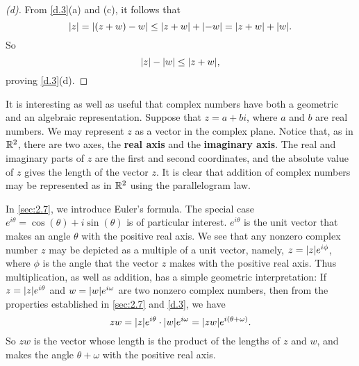 \begin{proof}[(d)]
  From \cref{d.3}(a) and (c), it follows that
  \[
    \abs{z} = \abs{(z + w) - w} \leq \abs{z + w} + \abs{-w} = \abs{z + w} + \abs{w}.
  \]
  So
  \[
    \abs{z} - \abs{w} \leq \abs{z + w},
  \]
  proving \cref{d.3}(d).
\end{proof}

\begin{defn}\label{d.0.6}
  It is interesting as well as useful that complex numbers have both a geometric and an algebraic representation.
  Suppose that \(z = a + bi\), where \(a\) and \(b\) are real numbers.
  We may represent \(z\) as a vector in the complex plane.
  Notice that, as in \(\mathbb{R}^2\), there are two axes, the \textbf{real axis} and the \textbf{imaginary axis}.
  The real and imaginary parts of \(z\) are the first and second coordinates, and the absolute value of \(z\) gives the length of the vector \(z\).
  It is clear that addition of complex numbers may be represented as in \(\mathbb{R}^2\) using the parallelogram law.

  In \cref{sec:2.7}, we introduce Euler's formula.
  The special case \(e^{i \theta} = \cos(\theta) + i \sin(\theta)\) is of particular interest.
  \(e^{i \theta}\) is the unit vector that makes an angle \(\theta\) with the positive real axis.
  We see that any nonzero complex number \(z\) may be depicted as a multiple of a unit vector, namely, \(z = \abs{z} e^{i \phi}\), where \(\phi\) is the angle that the vector \(z\) makes with the positive real axis.
  Thus multiplication, as well as addition, has a simple geometric interpretation:
  If \(z = \abs{z} e^{i \theta}\) and \(w = \abs{w} e^{i \omega}\) are two nonzero complex numbers, then from the properties established in \cref{sec:2.7} and \cref{d.3}, we have
  \[
    zw = \abs{z} e^{i \theta} \cdot \abs{w} e^{i \omega} = \abs{zw} e^{i (\theta + \omega)}.
  \]
  So \(zw\) is the vector whose length is the product of the lengths of \(z\) and \(w\), and makes the angle \(\theta + \omega\) with the positive real axis.
\end{defn}
